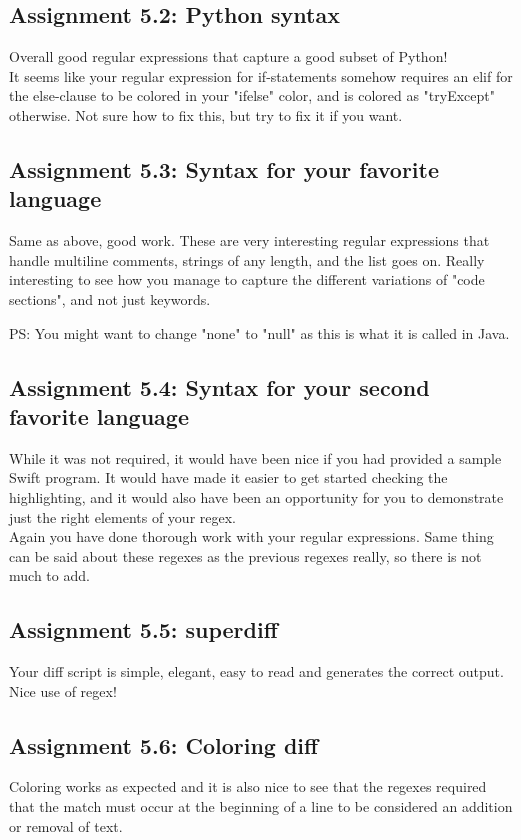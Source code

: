 \documentclass[a4paper]{article}
\begin{document}
\subsection*{Assignment 5.2: Python syntax} \label{sec:assignment5.2}
Overall good regular expressions that capture a good subset of Python!\\
It seems like your regular expression for if-statements somehow requires an elif for the else-clause to be colored in your "ifelse" color, and is colored as "tryExcept" otherwise. Not sure how to fix this, but try to fix it if you want.

\subsection*{Assignment 5.3: Syntax for your favorite language}

Same as above, good work. These are very interesting regular expressions that handle multiline comments, strings of any length, and the list goes on. Really interesting to see how you manage to capture the different variations of "code sections", and not just keywords.

PS: You might want to change "none" to "null" as this is what it is called in Java.

\subsection*{Assignment 5.4: Syntax for your second favorite language}

While it was not required, it would have been nice if you had provided a sample Swift program. It would have made it easier to get started checking the highlighting, and it would also have been an opportunity for you to demonstrate just the right elements of your regex.
\\Again you have done thorough work with your regular expressions. Same thing can be said about these regexes as the previous regexes really, so there is not much to add.


\subsection*{Assignment 5.5: superdiff}
Your diff script is simple, elegant, easy to read and generates the correct output. Nice use of regex!


\subsection*{Assignment 5.6:  Coloring diff}

Coloring works as expected and it is also nice to see that the regexes required that the match must occur at the beginning of a line to be considered an addition or removal of text.




\end{document}
